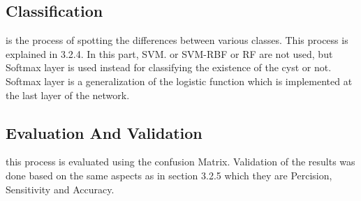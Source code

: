 \subsection{Classification} is the process of spotting the differences between various classes.
This process is explained in 3.2.4. 
In this part, SVM. or SVM-RBF or RF are not used, but Softmax layer is used instead for classifying the existence of the cyst or not.
Softmax layer is a generalization of the logistic function which is implemented at the last layer of the network.
\subsection{Evaluation And Validation} this process is evaluated using the confusion Matrix.
Validation of the results was done based on the same aspects as in section 3.2.5 which they are Percision, Sensitivity and Accuracy.

 













